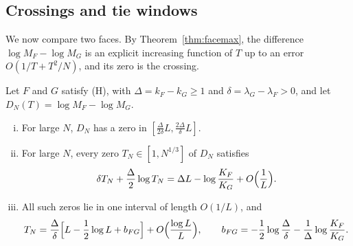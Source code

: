 \subsection{Crossings and tie windows}\label{sec:crossings}

We now compare two faces. By Theorem~\ref{thm:facemax}, the
difference $\log M_F-\log M_G$ is an explicit increasing function of $T$ up to
an error $O(1/T+T^2/N)$, and its zero is the crossing.

\begin{theorem}\label{thm:crossing}
Let $F$ and $G$ satisfy (H), with $\Delta=k_F-k_G\ge1$ and
$\delta=\lambda_G-\lambda_F>0$, and let $D_N(T)=\log M_F-\log M_G$.
\begin{enumerate}[(i)]
\item For large $N$, $D_N$ has a zero in
$[\frac{\Delta}{2\delta}L,\frac{2\Delta}{\delta}L]$.
\item For large $N$, every zero $T_N\in[1,N^{1/3}]$ of $D_N$ satisfies
\begin{equation}\label{eq:crossing}
\delta T_N+\frac\Delta2\log T_N=\Delta L-\log\frac{K_F}{K_G}
+O\Bigl(\frac1L\Bigr).
\end{equation}
\item All such zeros lie in one interval of length $O(1/L)$, and
\[
T_N=\frac\Delta\delta\Bigl[L-\frac12\log L+b_{FG}\Bigr]
+O\Bigl(\frac{\log L}L\Bigr),\qquad
b_{FG}=-\frac12\log\frac\Delta\delta-\frac1\Delta\log\frac{K_F}{K_G}.
\]
\end{enumerate}
\end{theorem}

